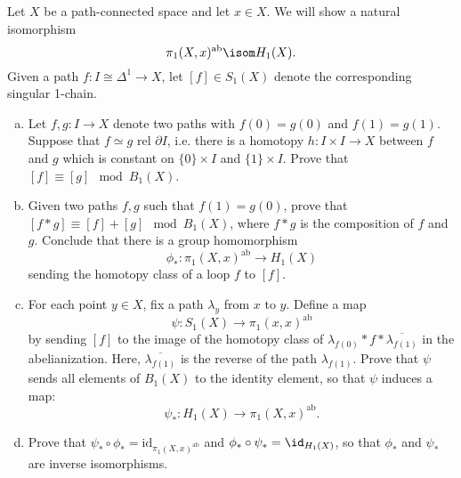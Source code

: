 \documentclass[11pt,letterpaper]{article}
\begin{document}
\begin{problem}
    Let $X$ be a path-connected space and let $x\in X$. We will show a natural isomorphism
    \[
        \pi_1(X,x)^{\text{ab}} \isom H_1(X)
    .\] 
    Given a path $f :I\cong \Delta^1 \to X$, let $[f]\in S_1(X)$ denote the corresponding singular 1-chain.
    \begin{enumerate}[(a)]
        \item Let $f,g : I \to X$ denote two paths with $f(0)=g(0)$ and $f(1)=g(1)$. Suppose that $f\simeq g$ rel $\partial I$, i.e. there is a homotopy $h: I\times I\to X$ between $f$ and $g$ which is constant on $\{0\}\times I$ and $\{1\}\times I$. Prove that $[f]\equiv [g]\mod B_1(X)$.
        \item Given two paths $f,g$ such that $f(1)=g(0)$, prove that $[f*g]\equiv [f]+[g]\mod B_1(X)$, where $f*g$ is the composition of $f$ and $g$. Conclude that there is a group homomorphism 
        \[
            \phi_* : \pi_1(X,x)^\text{ab} \to H_1(X)    
        \]
        sending the homotopy class of a loop $f$ to $[f]$.
        \item For each point $y\in X$, fix a path $\lambda_y$ from $x$ to $y$. Define a map 
        \[
            \psi : S_1(X) \to \pi_1(x,x)^\text{ab}    
        \]
        by sending $[f]$ to the image of the homotopy class of $\lambda_{f(0)}*f*\overline{\lambda_{f(1)}}$ in the abelianization. Here, $\overline{\lambda_{f(1)}}$ is the reverse of the path $\lambda_{f(1)}$. Prove that $\psi$ sends all elements of $B_1(X)$ to the identity element, so that $\psi$ induces a map: \[
            \psi_* : H_1(X) \to \pi_1(X,x)^\text{ab}
        .\]
        \item Prove that $\psi_* \circ \phi_* = \text{id}_{\pi_1(X,x)^\text{ab}}$ and $\phi_* \circ \psi_* = \id_{H_1(X)}$, so that $\phi_*$ and $\psi_*$ are inverse isomorphisms.  
    \end{enumerate}
\end{problem}
\end{document}
